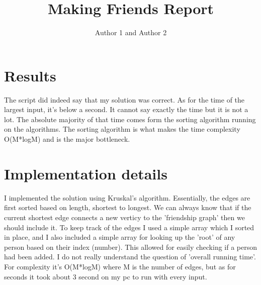 \documentclass{article}
\title{Making Friends Report}
\author{Author 1 and Author 2}
\begin{document}
  \maketitle

  \section{Results}

  The script did indeed say that my solution was correct.
  As for the time of the largest input, it's below a second. It cannot say exactly the time but it is not a lot. The absolute
  majority of that time comes form the sorting algorithm running on the algorithms. The sorting algorithm is what makes the time
  complexity O(M*logM) and is the major bottleneck.

  \section{Implementation details}

  I implemented the solution using Kruskal's algorithm. Essentially, the edges are first sorted based on length, shortest to longest.
  We can always know that if the current shortest edge connects a new verticy to the 'friendship graph' then we should include it.
  To keep track of the edges I used a simple array which I sorted in place, and I also included a simple array for looking up the
  'root' of any person based on their index (number). This allowed for easily checking if a person had been added.
  I do not really understand the question of 'overall running time'. For complexity it's O(M*logM) where M is the number of edges,
  but as for seconds it took about 3 second on my pc to run with every input.
\end{document}
